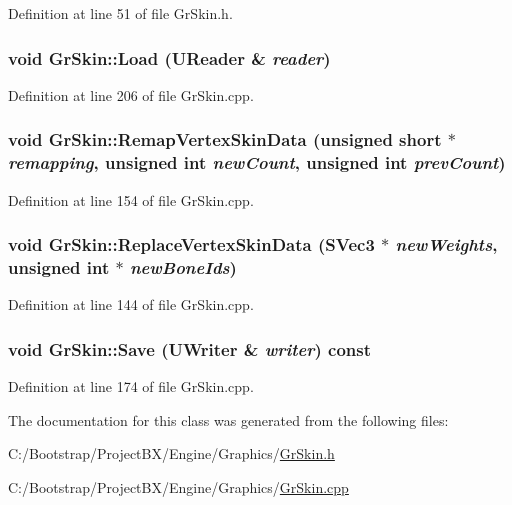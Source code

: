 Definition at line 51 of file GrSkin.h.\hypertarget{class_gr_skin_317090211672b8425cd5b1494eabffdd}{
\subsubsection[{Load}]{\setlength{\rightskip}{0pt plus 5cm}void GrSkin::Load ({\bf UReader} \& {\em reader})}}
\label{class_gr_skin_317090211672b8425cd5b1494eabffdd}




Definition at line 206 of file GrSkin.cpp.\hypertarget{class_gr_skin_9f7c0397243a62abb74590a6fa0d6bc0}{
\subsubsection[{RemapVertexSkinData}]{\setlength{\rightskip}{0pt plus 5cm}void GrSkin::RemapVertexSkinData (unsigned short $\ast$ {\em remapping}, \/  unsigned int {\em newCount}, \/  unsigned int {\em prevCount})}}
\label{class_gr_skin_9f7c0397243a62abb74590a6fa0d6bc0}




Definition at line 154 of file GrSkin.cpp.\hypertarget{class_gr_skin_ffef9a16b667c75cf91f2b3850b1421a}{
\subsubsection[{ReplaceVertexSkinData}]{\setlength{\rightskip}{0pt plus 5cm}void GrSkin::ReplaceVertexSkinData ({\bf SVec3} $\ast$ {\em newWeights}, \/  unsigned int $\ast$ {\em newBoneIds})}}
\label{class_gr_skin_ffef9a16b667c75cf91f2b3850b1421a}




Definition at line 144 of file GrSkin.cpp.\hypertarget{class_gr_skin_4aa56f5dcc36289d344a2e2dc9ee98e8}{
\subsubsection[{Save}]{\setlength{\rightskip}{0pt plus 5cm}void GrSkin::Save ({\bf UWriter} \& {\em writer}) const}}
\label{class_gr_skin_4aa56f5dcc36289d344a2e2dc9ee98e8}




Definition at line 174 of file GrSkin.cpp.

The documentation for this class was generated from the following files:\begin{CompactItemize}
\item 
C:/Bootstrap/ProjectBX/Engine/Graphics/\hyperlink{_gr_skin_8h}{GrSkin.h}\item 
C:/Bootstrap/ProjectBX/Engine/Graphics/\hyperlink{_gr_skin_8cpp}{GrSkin.cpp}\end{CompactItemize}
